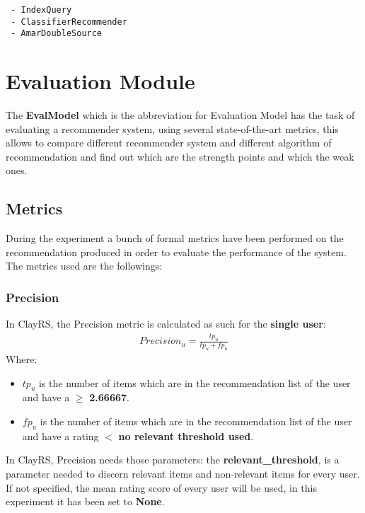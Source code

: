 \documentclass[11pt]{article}
\begin{document}
    \lstinline[style=verbatim-text]| - IndexQuery |  \\


    \lstinline[style=verbatim-text]| - ClassifierRecommender |  \\


    \lstinline[style=verbatim-text]| - AmarDoubleSource |  \\



\section{Evaluation Module}\label{sec:eva-module}
The \textbf{EvalModel} which is the abbreviation for Evaluation Model has the task of evaluating a recommender system,
using several state-of-the-art metrics, this allows to compare different recommender system and different algorithm of
recommendation and find out which are the strength points and which the weak ones.

\subsection{Metrics}\label{subsec:metrics}
During the experiment a bunch of formal metrics have been performed on the recommendation produced in order to evaluate
the performance of the system.
The metrics used are the followings:
\hfill\break
\hfill\break

\subsubsection{Precision}\label{subsubsec:precision}
In ClayRS, the Precision metric is calculated as such for the \textbf{single user}:
\hfill\break
\hfill\break
    \[
        \begin{gathered}
         Precision_u = \frac{tp_u}{tp_u + fp_u}
        \end{gathered}
    \]
\hfill\break
\hfill\break
    Where:
\begin{itemize}
    \item $tp_u$ is the number of items which are in the recommendation list of the user and have a
       $\geq$         \textbf{2.66667}.
            \item $fp_u$ is the number of items which are in the recommendation list of the user and have a
      rating $<$         \textbf{no relevant threshold used}.
        \end{itemize}
\hfill\break
\hfill\break
In ClayRS, Precision needs those parameters:
the \textbf{relevant\_threshold}, is a parameter needed to discern relevant items and non-relevant items for every user.
If not specified, the mean rating score of every user will be used, in this experiment it has been set to
\textbf{None}.
\hfill\break
\hfill\break
\end{document}
